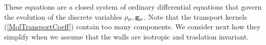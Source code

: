 \documentclass[b5paper,openright,11pt]{book}
\begin{document}

These equations are a closed system of ordinary differential equations
that  govern the  evolution of  the discrete  variables $\rho_\mu,{\bf
  g}_\mu$. Note  that the transport  kernels (\ref{MolTransportCoeff})
contain too many  components. We consider next how  they simplify when
we assume that the walls are isotropic and traslation invariant.
\end{document}

